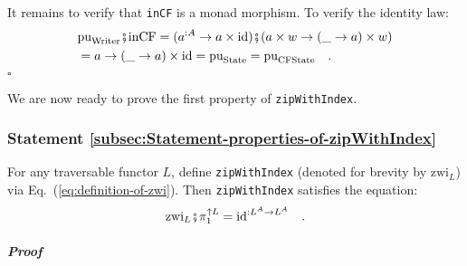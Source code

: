 It remains to verify that \lstinline!inCF! is a monad morphism. To
verify the identity law:
\begin{align*}
 & \text{pu}_{\text{Writer}}\bef\text{inCF}=(a^{:A}\rightarrow a\times\text{id})\bef(a\times w\rightarrow(\_\rightarrow a)\times w)\\
 & =a\rightarrow(\_\rightarrow a)\times\text{id}=\text{pu}_{\text{State}}=\text{pu}_{\text{CFState}}\quad.
\end{align*}
$\square$

We are now ready to prove the first property of \lstinline!zipWithIndex!.

\subsubsection{Statement \label{subsec:Statement-properties-of-zipWithIndex}\ref{subsec:Statement-properties-of-zipWithIndex}}

For any traversable functor $L$, define \lstinline!zipWithIndex!
(denoted for brevity by $\text{zwi}_{L}$) via Eq.~(\ref{eq:definition-of-zwi}).
Then \lstinline!zipWithIndex! satisfies the equation:
\[
\text{zwi}_{L}\bef\pi_{1}^{\uparrow L}=\text{id}^{:L^{A}\rightarrow L^{A}}\quad.
\]


\subparagraph{Proof}

